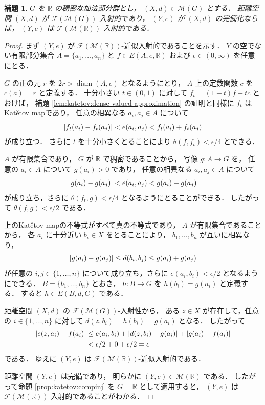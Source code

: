 \documentclass[leqno, 12pt]{jsarticle}
\newtheorem{lem}[thm]{補題}
\newcommand{\rr}{\mathbb{R}}
\DeclareMathOperator{\di}{diam}
\DeclarePairedDelimiter{\abs}{\lvert}{\rvert}
\newcommand{\Met}[1]{\mathscr{M}(#1)}
\newcommand{\FinitePart}[1]{\mathscr{F}(#1)}
\newcommand{\FinMet}[1]{\FinitePart{\Met{#1}}}
\newcommand{\Espace}[3]{E(#1,#2,#3)}
\newcommand{\KatDist}{\theta}
\begin{document}
\begin{lem}\label{lem:katetov:dense-completion-real-injective}
$G$
を
$\rr$
の稠密な加法部分群とし，
$(X,d)\in\Met{G}$
とする．
距離空間
$(X, d)$
が
$\FinMet{G}$-入射的であり，
$(Y,e)$
が
$(X, d)$
の完備化ならば，
$(Y,e)$
は
$\FinMet{\rr}$-入射的である．
\end{lem}
\begin{proof}
まず
$(Y,e)$
が
$\FinMet{\rr}$-近似入射的であることを示す．
$Y$
の空でない有限部分集合
$A=\{a_1,\dots,a_n\}$
と
$f\in\Espace{A}{e}{\rr}$
および
$\epsilon\in(0,\infty)$
を任意にとる．


$G$
の正の元
$r$
を
$2r>\di(A,e)$
となるようにとり，
$A$
上の定数関数
$c$
を
$c(a)=r$
と定義する．
十分小さい
$t\in(0,1)$
に対して
$f_{t}=(1-t)f+tc$
とおけば，
補題
\ref{lem:katetov:dense-valued-approximation}
の証明と同様に
$f_{t}$
はKat\v{e}tov mapであり，
任意の相異なる
$a_{i}, a_{j}\in A$
について
\[
\abs{f_{t}(a_{i})-f_{t}(a_{j})}
<e(a_{i}, a_{j})
<f_{t}(a_{i})+f_{t}(a_{j})
\]
が成り立つ．
さらに
$t$
を十分小さくとることにより
$\KatDist(f, f_{t})<\epsilon/4$
とできる．


$A$
が有限集合であり，
$G$
が
$\rr$
で稠密であることから，
写像
$g\colon A\to G$
を，
任意の
$a_i\in A$
について
$g(a_{i})>0$
であり，
任意の相異なる
$a_{i}, a_{j}\in A$
について
\[
\abs{g(a_i)-g(a_j)}
<e(a_i,a_j)
<g(a_i)+g(a_j)
\]
が成り立ち，さらに
$\KatDist(f_t,g)<\epsilon/4$
となるようにとることができる．
したがって
$\KatDist(f,g)<\epsilon/2$
である．


上のKat\v{e}tov mapの不等式がすべて真の不等式であり，
$A$
が有限集合であることから，
各
$a_i$
に十分近い
$b_i\in X$
をとることにより，
$b_1,\dots,b_n$
が互いに相異なり，
\[
\abs{g(a_{i})-g(a_{j})}
\le d(b_{i}, b_{j})
\le g(a_{i})+g(a_{j})
\]
が任意の
$i, j\in\{1,\dots,n\}$
について成り立ち，さらに
$e(a_{i}, b_{i})<\epsilon/2$
となるようにできる．
$B=\{b_{1},\dots,b_{n}\}$
とおき，
$h\colon B\to G$
を
$h(b_{i})=g(a_{i})$
と定義する．
すると
$h\in\Espace{B}{d}{G}$
である．


距離空間
$(X,d)$
の
$\FinMet{G}$-入射性から，
ある
$z\in X$
が存在して，任意の
$i\in\{1,\dots,n\}$
に対して
$d(z, b_{i})=h(b_{i})=g(a_{i})$
となる．
したがって
\begin{align*}
\abs{e(z,a_i)-f(a_i)}
&\le e(a_i,b_i)
 +\abs{d(z,b_i)-g(a_i)}
 +\abs{g(a_i)-f(a_i)}\\
&<\epsilon/2+0+\epsilon/2
=\epsilon
\end{align*}
である．
ゆえに
$(Y,e)$
は
$\FinMet{\rr}$-近似入射的である．


距離空間
$(Y,e)$
は完備であり，
明らかに
$(Y,e)\in\Met{\rr}$
である．
したがって命題
\ref{prop:katetov:compinj}
を
$G=\rr$
として適用すると，
$(Y,e)$
は
$\FinMet{\rr}$-入射的であることがわかる．
\end{proof}
\end{document}
